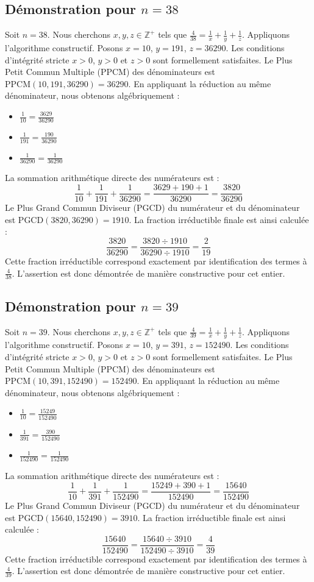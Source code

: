 \documentclass[11pt,a4paper]{article}
\begin{document}
\subsection{Démonstration pour $n = 38$}
Soit $n = 38$. Nous cherchons $x, y, z \in \mathbb{Z}^{+}$ tels que $\frac{4}{38} = \frac{1}{x} + \frac{1}{y} + \frac{1}{z}$.
Appliquons l'algorithme constructif. Posons $x = 10$, $y = 191$, $z = 36290$.
Les conditions d'intégrité stricte $x > 0$, $y > 0$ et $z > 0$ sont formellement satisfaites.
Le Plus Petit Commun Multiple (PPCM) des dénominateurs est $\text{PPCM}(10, 191, 36290) = 36290$.
En appliquant la réduction au même dénominateur, nous obtenons algébriquement :
\begin{itemize}
    \item $\frac{1}{10} = \frac{3629}{36290}$
    \item $\frac{1}{191} = \frac{190}{36290}$
    \item $\frac{1}{36290} = \frac{1}{36290}$
\end{itemize}
La sommation arithmétique directe des numérateurs est :
$$ \frac{1}{10} + \frac{1}{191} + \frac{1}{36290} = \frac{3629 + 190 + 1}{36290} = \frac{3820}{36290} $$
Le Plus Grand Commun Diviseur (PGCD) du numérateur et du dénominateur est $\text{PGCD}(3820, 36290) = 1910$.
La fraction irréductible finale est ainsi calculée :
$$ \frac{3820}{36290} = \frac{3820 \div 1910}{36290 \div 1910} = \frac{2}{19} $$
Cette fraction irréductible correspond exactement par identification des termes à $\frac{4}{38}$. L'assertion est donc démontrée de manière constructive pour cet entier.

\subsection{Démonstration pour $n = 39$}
Soit $n = 39$. Nous cherchons $x, y, z \in \mathbb{Z}^{+}$ tels que $\frac{4}{39} = \frac{1}{x} + \frac{1}{y} + \frac{1}{z}$.
Appliquons l'algorithme constructif. Posons $x = 10$, $y = 391$, $z = 152490$.
Les conditions d'intégrité stricte $x > 0$, $y > 0$ et $z > 0$ sont formellement satisfaites.
Le Plus Petit Commun Multiple (PPCM) des dénominateurs est $\text{PPCM}(10, 391, 152490) = 152490$.
En appliquant la réduction au même dénominateur, nous obtenons algébriquement :
\begin{itemize}
    \item $\frac{1}{10} = \frac{15249}{152490}$
    \item $\frac{1}{391} = \frac{390}{152490}$
    \item $\frac{1}{152490} = \frac{1}{152490}$
\end{itemize}
La sommation arithmétique directe des numérateurs est :
$$ \frac{1}{10} + \frac{1}{391} + \frac{1}{152490} = \frac{15249 + 390 + 1}{152490} = \frac{15640}{152490} $$
Le Plus Grand Commun Diviseur (PGCD) du numérateur et du dénominateur est $\text{PGCD}(15640, 152490) = 3910$.
La fraction irréductible finale est ainsi calculée :
$$ \frac{15640}{152490} = \frac{15640 \div 3910}{152490 \div 3910} = \frac{4}{39} $$
Cette fraction irréductible correspond exactement par identification des termes à $\frac{4}{39}$. L'assertion est donc démontrée de manière constructive pour cet entier.
\end{document}
